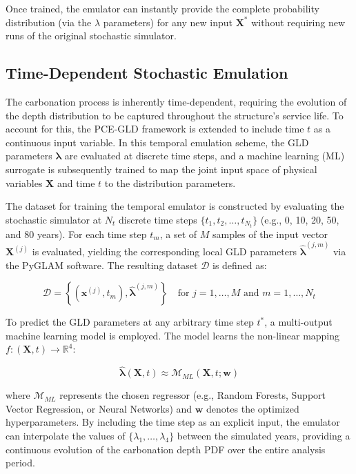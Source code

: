 Once trained, the emulator can instantly provide the complete probability distribution (via the $\lambda$ parameters) for any new input $\mathbf{X}^*$ without requiring new runs of the original stochastic simulator.

\subsection{Time-Dependent Stochastic Emulation}

The carbonation process is inherently time-dependent, requiring the evolution of the depth distribution to be captured throughout the structure's service life. To account for this, the PCE-GLD framework is extended to include time $t$ as a continuous input variable. In this temporal emulation scheme, the GLD parameters $\boldsymbol{\lambda}$ are evaluated at discrete time steps, and a machine learning (ML) surrogate is subsequently trained to map the joint input space of physical variables $\mathbf{X}$ and time $t$ to the distribution parameters.

The dataset for training the temporal emulator is constructed by evaluating the stochastic simulator at $N_t$ discrete time steps $\{t_1, t_2, \dots, t_{N_t}\}$ (e.g., 0, 10, 20, 50, and 80 years). For each time step $t_m$, a set of $M$ samples of the input vector $\mathbf{X}^{(j)}$ is evaluated, yielding the corresponding local GLD parameters $\hat{\boldsymbol{\lambda}}^{(j, m)}$ via the PyGLAM software. The resulting dataset $\mathcal{D}$ is defined as:

\begin{equation}
\mathcal{D} = \left\{ \left( \mathbf{x}^{(j)}, t_m \right), \hat{\boldsymbol{\lambda}}^{(j, m)} \right\} \quad \text{for } j=1,\dots,M \text{ and } m=1,\dots,N_t
\end{equation}

To predict the GLD parameters at any arbitrary time step $t^*$, a multi-output machine learning model is employed. The model learns the non-linear mapping $f: (\mathbf{X}, t) \to \mathbb{R}^4$:

\begin{equation}
\hat{\boldsymbol{\lambda}}(\mathbf{X}, t) \approx \mathcal{M}_{ML}(\mathbf{X}, t; \mathbf{w})
\end{equation}

where $\mathcal{M}_{ML}$ represents the chosen regressor (e.g., Random Forests, Support Vector Regression, or Neural Networks) and $\mathbf{w}$ denotes the optimized hyperparameters. By including the time step as an explicit input, the emulator can interpolate the values of $\{\lambda_1, \dots, \lambda_4\}$ between the simulated years, providing a continuous evolution of the carbonation depth PDF over the entire analysis period.

